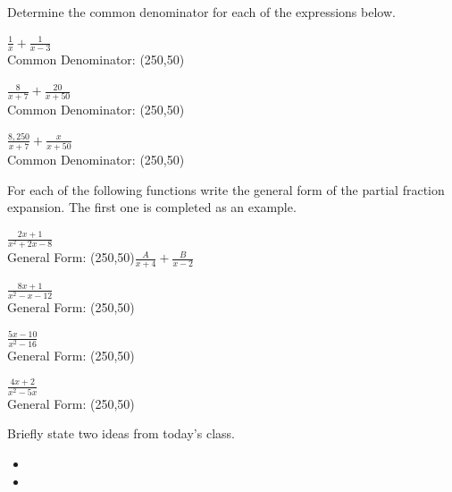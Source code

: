 \begin{problem}
\item Determine the common denominator for each of the expressions below.
  \begin{subproblem}
    \item $\frac{1}{x} + \frac{1}{x-3}$ \\
      Common Denominator: \framebox(250,50){~}
      \vfill
    \item $\frac{8}{x+7} + \frac{20}{x+50}$ \\
      Common Denominator: \framebox(250,50){~}
      \vfill
    \item $\frac{8,250}{x+7} + \frac{x}{x+50}$ \\
      Common Denominator: \framebox(250,50){~}
      \vfill
  \end{subproblem}

  \clearpage

\item For each of the following functions write the general form of
  the partial fraction expansion. The first one is completed as an
  example.
  \begin{subproblem}
    \item $\frac{2x+1}{x^2+2x-8}$ \\
      General Form: \framebox(250,50){$\frac{A}{x+4} + \frac{B}{x-2}$}
      \vfill
    \item $\frac{8x+1}{x^2-x-12}$ \\
      General Form: \framebox(250,50){~}
      \vfill
    \item $\frac{5x-10}{x^2-16}$ \\
      General Form: \framebox(250,50){~}
      \vfill
    \item $\frac{4x+2}{x^2-5x}$ \\
      General Form: \framebox(250,50){~}
      \vfill
  \end{subproblem}

\end{problem}

\postClass

\begin{problem}
\item Briefly state two ideas from today's class.
  \begin{itemize}
  \item
  \item
  \end{itemize}
\item
  \begin{subproblem}
    \item
  \end{subproblem}
\end{problem}


